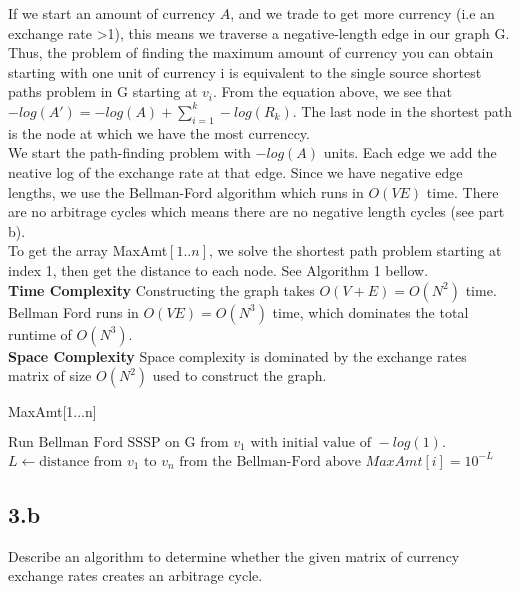 \documentclass[11pt]{article}
\begin{document}
\begin{solution}
If we start an amount of currency $A$, and we trade to get more currency (i.e an exchange rate >1), this means we traverse a negative-length edge in our graph G.  Thus, the problem of finding the maximum amount of currency you can obtain starting with one unit of currency i is equivalent to the single source shortest paths problem in G starting at $v_i$. From the equation above, we see that $-log(A')=-log(A)+\sum_{i=1}^{k} -log(R_k)$. The last node in the shortest path is the node at which we have the most currenccy. \\ 

We start the path-finding problem with $-log(A)$ units. Each edge we add the neative log of the exchange rate at that edge. Since we have negative edge lengths, we use the Bellman-Ford algorithm which runs in $O(VE)$ time. There are no arbitrage cycles which means there are no negative length cycles (see part b).  \\

To get the array MaxAmt$[1..n]$, we solve the shortest path problem starting at index 1, then get the distance to each node. See Algorithm 1 bellow. \\

\textbf{Time Complexity}
Constructing the graph takes $O(V+E)=O(N^2)$ time.
Bellman Ford runs in $O(VE)=O(N^3)$ time, which dominates the total runtime of $O(N^3)$. \\

\textbf{Space Complexity} 
Space complexity is dominated by the exchange rates matrix of size $O(N^2)$ used to construct the graph.

\begin{algorithm}
\caption{MaxAmt[1...n]}
\begin{algorithmic}
\STATE $\text{Run Bellman Ford SSSP on G from }v_1 \text{ with initial value of } -log(1).$
\STATE $L \gets \text{distance from } v_1 \text{ to } v_n \text{ from the Bellman-Ford above}$
\STATE $MaxAmt[i] = 10^{-L}$
\ENDFOR
\end{algorithmic}
\end{algorithm} 


\end{solution}

\clearpage



\subsection *{3.b} Describe an algorithm to determine whether the given matrix of currency exchange rates creates an arbitrage cycle. 
\end{document}
